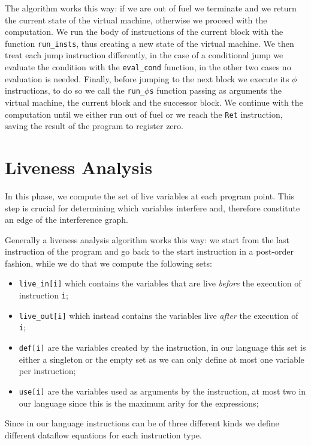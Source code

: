 The algorithm works this way: if we are out of fuel we terminate and we return the current state of the virtual machine, otherwise we proceed with the computation.
We run the body of instructions of the current block with the function \texttt{run\_insts}, thus creating a new state of the virtual machine. We then treat each jump instruction differently, in the case of a conditional jump we evaluate the condition with the \texttt{eval\_cond} function, in the other two cases no evaluation is needed. Finally, before jumping to the next block we execute its $\phi$ instructions, to do so we call the \texttt{run\_$\phi$s} function  passing as arguments the virtual machine, the current block and the successor block.
We continue with the computation until we either run out of fuel or we reach the \texttt{Ret} instruction, saving the result of the program to register zero.

\section{Liveness Analysis}
\label{sec:liveness}

In this phase, we compute the set of live variables at each program point. This step is crucial for determining which variables interfere and, therefore constitute an edge of the interference graph.

Generally a liveness analysis algorithm works this way:
we start from the last instruction of the program and go back to the start instruction in a post-order fashion, while we do that we compute the following sets:
\begin{itemize}
  \item \texttt{live\_in[i]} which contains the variables that are live \textit{before} the execution of instruction \texttt i;
  \item \texttt{live\_out[i]} which instead contains the variables live \textit{after} the execution of \texttt i;
  \item \texttt{def[i]} are the variables created by the instruction, in our language this set is either a singleton or the empty set as we can only define at most one variable per instruction;
  \item \texttt{use[i]} are the variables used as arguments by the instruction, at most two in our language since this is the maximum arity for the expressions;
\end{itemize}

Since in our language instructions can be of three different kinds we define different dataflow equations for each instruction type.

